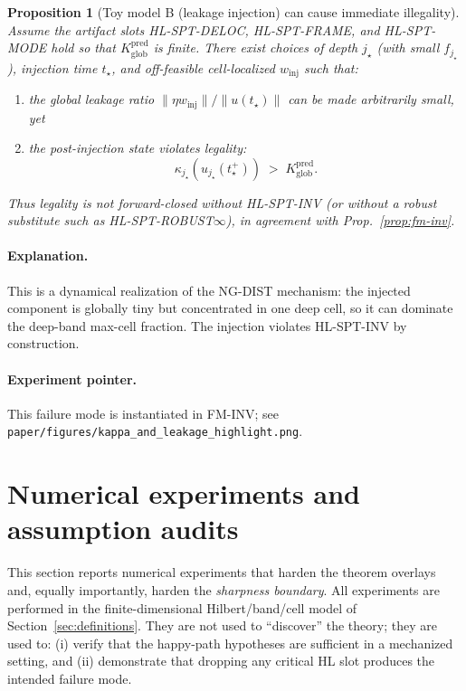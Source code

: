 \documentclass[11pt]{article}
\newtheorem{proposition}[definition]{Proposition}
\begin{document}
\begin{proposition}[Toy model B (leakage injection) can cause immediate illegality]\label{prop:toy-ladder-leakage}
Assume the artifact slots HL-SPT-DELOC, HL-SPT-FRAME, and HL-SPT-MODE hold so that $K^{\mathrm{pred}}_{\mathrm{glob}}$ is finite.
There exist choices of depth $j_\star$ (with small $f_{j_\star}$), injection time $t_\star$, and off-feasible cell-localized $w_{\mathrm{inj}}$ such that:
\begin{enumerate}
\item the global leakage ratio $\|\eta w_{\mathrm{inj}}\|/\|u(t_\star)\|$ can be made arbitrarily small, yet
\item the post-injection state violates legality:
\[
\kappa_{j_\star}(u_{j_\star}(t_\star^+)) \;>\; K^{\mathrm{pred}}_{\mathrm{glob}}.
\]
\end{enumerate}
Thus legality is not forward-closed without HL-SPT-INV (or without a robust substitute such as HL-SPT-ROBUST$\infty$), in agreement with Prop.~\ref{prop:fm-inv}.
\end{proposition}

\paragraph{Explanation.}
This is a dynamical realization of the NG-DIST mechanism: the injected component is globally tiny but concentrated in one deep cell, so it can dominate the deep-band max-cell fraction.
The injection violates HL-SPT-INV by construction.

\paragraph{Experiment pointer.}
This failure mode is instantiated in FM-INV; see \nolinkurl{paper/figures/kappa_and_leakage_highlight.png}.
 \section{Numerical experiments and assumption audits}\label{sec:experiments}

This section reports numerical experiments that harden the theorem overlays and, equally importantly, harden the \emph{sharpness boundary}.
All experiments are performed in the finite-dimensional Hilbert/band/cell model of Section~\ref{sec:definitions}.
They are not used to ``discover'' the theory; they are used to:
(i) verify that the happy-path hypotheses are sufficient in a mechanized setting, and
(ii) demonstrate that dropping any critical HL slot produces the intended failure mode.
\end{document}
